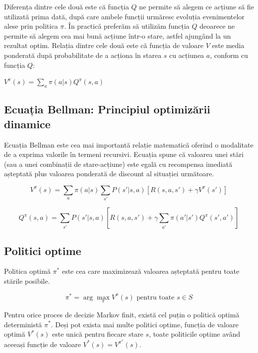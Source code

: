 Diferența dintre cele două este că funcția $Q$ ne permite să alegem ce acțiune să fie utilizată prima dată, după care ambele funcții urmăresc evoluția evenimentelor alese prin politica $\pi$. În practică preferăm să utilizăm funcția $Q$ deoarece ne permite să alegem cea mai bună acțiune într-o stare, astfel ajungând la un rezultat optim. Relația dintre cele două este că funcția de valoare $V$ este media ponderată după probabilitate de a acționa în starea $s$ cu acțiunea $a$, conform cu funcția $Q$:
\begin{center}
    $V^\pi(s) = \sum_a \pi(a|s) Q^\pi(s,a)$
\end{center}

\subsection{Ecuația Bellman: Principiul optimizării dinamice}
Ecuația Bellman este cea mai importantă relație matematică oferind o modalitate de a exprima valorile în termeni recursivi. Ecuația spune că valoarea unei stări (sau a unei combinații de stare-acțiune) este egală cu recompensa imediată așteptată plus valoarea ponderată de discount al situației următoare.

\begin{equation}
V^\pi(s) = \sum_a \pi(a|s) \sum_{s'} P(s'|s,a)[R(s,a,s') + \gamma V^\pi(s')]
\label{eq:bellman_v}
\end{equation}

\begin{equation}
Q^\pi(s,a) = \sum_{s'} P(s'|s,a)[R(s,a,s') + \gamma \sum_{a'} \pi(a'|s') Q^\pi(s',a')]
\label{eq:bellman_q}
\end{equation}

\subsection{Politici optime}
Politica optimă $\pi^*$ este cea care maximizează valoarea așteptată pentru toate stările posibile.

\begin{equation}
    \pi^* = \arg\max_\pi V^\pi(s) \text{ pentru toate } s \in S
\label{eq:optim_pi}
\end{equation}

Pentru orice proces de decizie Markov finit, există cel puțin o politică optimă deterministă $\pi^*$. Deși pot exista mai multe politici optime, funcția de valoare optimă $V^*(s)$ este unică pentru fiecare stare $s$, toate politicile optime având aceeași funcție de valoare $V^*(s) = V^{\pi^*}(s)$.

